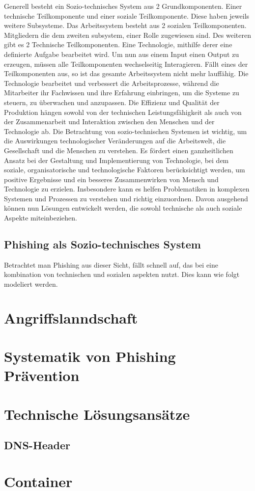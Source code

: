 \documentclass[journal=tosc,final]{iacrtrans}
\begin{document}
Generell besteht ein Sozio-technisches System aus 2 Grundkomponenten. Einer technische Teilkomponente und einer soziale Teilkomponente. Diese haben jeweils weitere Subsysteme. Das Arbeitssystem besteht aus 2 sozialen Teilkomponenten. Mitgliedern die dem zweiten subsystem, einer Rolle zugewiesen sind. Des weiteren gibt es 2 Technische Teilkomponenten. Eine Technologie, mithilfe derer eine definierte Aufgabe bearbeitet wird. Um nun aus einem Input einen Output zu erzeugen, müssen alle Teilkomponenten wechselseitig Interagieren. Fällt eines der Teilkomponenten aus, so ist das gesamte Arbeitssystem nicht mehr lauffähig. Die Technologie bearbeitet und verbessert die Arbeitsprozesse, während die Mitarbeiter ihr Fachwissen und ihre Erfahrung einbringen, um die Systeme zu steuern, zu überwachen und anzupassen. Die Effizienz und Qualität der Produktion hängen sowohl von der technischen Leistungsfähigkeit als auch von der Zusammenarbeit und Interaktion zwischen den Menschen und der Technologie ab. Die Betrachtung von sozio-technischen Systemen ist wichtig, um die Auswirkungen technologischer Veränderungen auf die Arbeitswelt, die Gesellschaft und die Menschen zu verstehen. Es fördert einen ganzheitlichen Ansatz bei der Gestaltung und Implementierung von Technologie, bei dem soziale, organisatorische und technologische Faktoren berücksichtigt werden, um positive Ergebnisse und ein besseres Zusammenwirken von Mensch und Technologie zu erzielen. Insbesondere kann es helfen Problematiken in komplexen Systemen und Prozessen zu verstehen und richtig einzuordnen. Davon ausgehend können nun Lösungen entwickelt werden, die sowohl technische als auch soziale Aspekte miteinbeziehen.  
\newpage
\subsection{Phishing als Sozio-technisches System}
Betrachtet man Phishing aus dieser Sicht, fällt schnell auf, das bei eine kombination von technischen und sozialen aspekten nutzt. Dies kann wie folgt modeliert werden. 
\section{Angriffslanndschaft}
\section{Systematik von Phishing Prävention}
\section{Technische Lösungsansätze}
\subsection{DNS-Header}
\section{Container}


\end{document}
